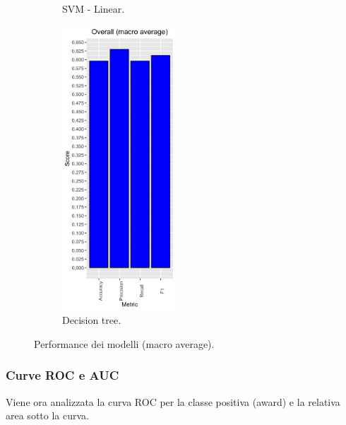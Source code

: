 \begin{figure}[H]
\begin{subfigure}[b]{0.3\textwidth}
		\caption{SVM - Linear.}
	\end{subfigure}
	\begin{subfigure}[b]{0.3\textwidth}
		\includegraphics[width=4.25cm]{../images/rpart_performance.png}
		\caption{Decision tree.}
	\end{subfigure}
	\caption{Performance dei modelli (macro average).}
\end{figure}


\subsubsection{Curve ROC e AUC}
Viene ora analizzata la curva ROC per la classe positiva (award) e la relativa area sotto la curva.

